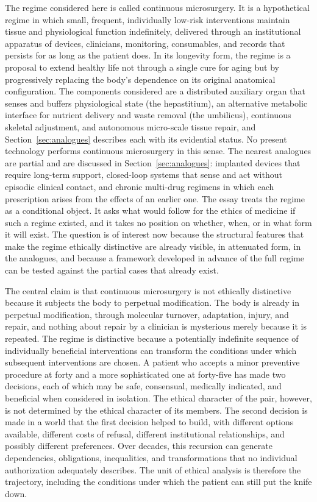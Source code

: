 \documentclass[11pt]{article}
\theoremstyle{plain}
\theoremstyle{definition}
\theoremstyle{remark}
\begin{document}
The regime considered here is called continuous microsurgery. It is a hypothetical regime in which small, frequent, individually low-risk interventions maintain tissue and physiological function indefinitely, delivered through an institutional apparatus of devices, clinicians, monitoring, consumables, and records that persists for as long as the patient does. In its longevity form, the regime is a proposal to extend healthy life not through a single cure for aging but by progressively replacing the body's dependence on its original anatomical configuration. The components considered are a distributed auxiliary organ that senses and buffers physiological state (the hepastitium), an alternative metabolic interface for nutrient delivery and waste removal (the umbilicus), continuous skeletal adjustment, and autonomous micro-scale tissue repair, and Section~\ref{sec:analogues} describes each with its evidential status. No present technology performs continuous microsurgery in this sense. The nearest analogues are partial and are discussed in Section~\ref{sec:analogues}: implanted devices that require long-term support, closed-loop systems that sense and act without episodic clinical contact, and chronic multi-drug regimens in which each prescription arises from the effects of an earlier one. The essay treats the regime as a conditional object. It asks what would follow for the ethics of medicine if such a regime existed, and it takes no position on whether, when, or in what form it will exist. The question is of interest now because the structural features that make the regime ethically distinctive are already visible, in attenuated form, in the analogues, and because a framework developed in advance of the full regime can be tested against the partial cases that already exist.

The central claim is that continuous microsurgery is not ethically distinctive because it subjects the body to perpetual modification. The body is already in perpetual modification, through molecular turnover, adaptation, injury, and repair, and nothing about repair by a clinician is mysterious merely because it is repeated. The regime is distinctive because a potentially indefinite sequence of individually beneficial interventions can transform the conditions under which subsequent interventions are chosen. A patient who accepts a minor preventive procedure at forty and a more sophisticated one at forty-five has made two decisions, each of which may be safe, consensual, medically indicated, and beneficial when considered in isolation. The ethical character of the pair, however, is not determined by the ethical character of its members. The second decision is made in a world that the first decision helped to build, with different options available, different costs of refusal, different institutional relationships, and possibly different preferences. Over decades, this recursion can generate dependencies, obligations, inequalities, and transformations that no individual authorization adequately describes. The unit of ethical analysis is therefore the trajectory, including the conditions under which the patient can still put the knife down.
\end{document}
